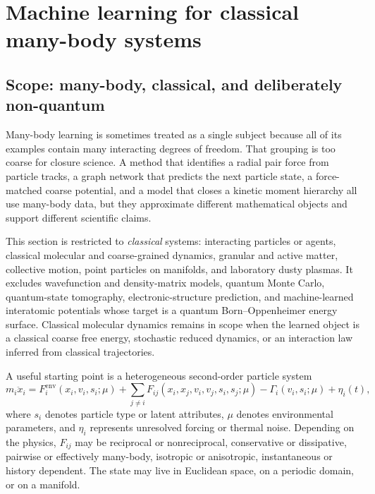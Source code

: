 \section{Machine learning for classical many-body systems}

\subsection{Scope: many-body, classical, and deliberately non-quantum}

Many-body learning is sometimes treated as a single subject because all of its examples contain many interacting degrees of freedom. That grouping is too coarse for closure science. A method that identifies a radial pair force from particle tracks, a graph network that predicts the next particle state, a force-matched coarse potential, and a model that closes a kinetic moment hierarchy all use many-body data, but they approximate different mathematical objects and support different scientific claims.

This section is restricted to \emph{classical} systems: interacting particles or agents, classical molecular and coarse-grained dynamics, granular and active matter, collective motion, point particles on manifolds, and laboratory dusty plasmas. It excludes wavefunction and density-matrix models, quantum Monte Carlo, quantum-state tomography, electronic-structure prediction, and machine-learned interatomic potentials whose target is a quantum Born--Oppenheimer energy surface. Classical molecular dynamics remains in scope when the learned object is a classical coarse free energy, stochastic reduced dynamics, or an interaction law inferred from classical trajectories.

A useful starting point is a heterogeneous second-order particle system
\begin{equation}
m_i\ddot x_i
=
F_i^{\mathrm{env}}(x_i,v_i,s_i;\mu)
+\sum_{j\ne i}F_{ij}(x_i,x_j,v_i,v_j,s_i,s_j;\mu)
-\Gamma_i(v_i,s_i;\mu)
+\eta_i(t),
\label{eq:classical-many-body}
\end{equation}
where \(s_i\) denotes particle type or latent attributes, \(\mu\) denotes environmental parameters, and \(\eta_i\) represents unresolved forcing or thermal noise. Depending on the physics, \(F_{ij}\) may be reciprocal or nonreciprocal, conservative or dissipative, pairwise or effectively many-body, isotropic or anisotropic, instantaneous or history dependent. The state may live in Euclidean space, on a periodic domain, or on a manifold.

